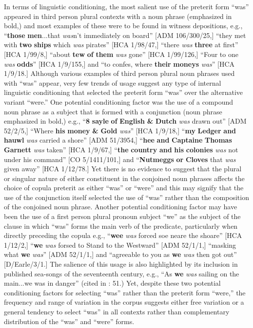 In terms of linguistic conditioning, the most salient use of the preterit form “was” appeared in third person plural contexts with a noun phrase (emphasized in bold,) and most examples of these were to be found in witness depositions, e.g., “\textbf{those} \textbf{men}...that \textit{was}n't immediately on board” [ADM 106/300/25,] “they met with \textbf{two} \textbf{ships} which \textit{was} pirates” [HCA 1/98/47,] “there \textit{was} \textbf{three} at first” [HCA 1/99/8,] “about \textbf{tew} \textbf{of} \textbf{them} \textit{was} gone” [HCA 1/99/126,] “Four to one \textit{was} \textbf{odds}” [HCA 1/9/155,] and “to confes, where \textbf{their} \textbf{moneys} \textit{was}” [HCA 1/9/18.] Although various examples of third person plural noun phrases used with “was” appear, very few trends of usage suggest any type of internal linguistic conditioning that selected the preterit form “was” over the alternative variant “were.”  One potential conditioning factor was the use of a compound noun phrase as a subject that is formed with a conjunction (noun phrase emphasized in bold,) e.g., “\textbf{8} \textbf{sayle} \textbf{of} \textbf{English} \textbf{\&}  \textbf{Dutch} \textit{was} drawn out” [ADM 52/2/5,] “Where \textbf{his} \textbf{money} \textbf{\&}  \textbf{Gold} \textit{was}” [HCA 1/9/18,] “\textbf{my} \textbf{Ledger} \textbf{and} \textbf{hauwl} \textit{was} carried a shore” [ADM 51/3954,] “\textbf{hee} \textbf{and} \textbf{Captaine} \textbf{Thomas} \textbf{Garnett} \textit{was} taken” [HCA 1/9/67,] “\textbf{the} \textbf{country} \textbf{and} \textbf{his} \textbf{colonies} \textit{was} not under his command” [CO 5/1411/101,] and “\textbf{Nutmeggs} \textbf{or} \textbf{Cloves} that \textit{was} given away” [HCA 1/12/78.] Yet there is no evidence to suggest that the plural or singular nature of either constituent in the conjoined noun phrases affects the choice of copula preterit as either “was” or “were” and this may signify that the use of the conjunction itself selected the use of “was” rather than the composition of the conjoined noun phrase. Another potential conditioning factor may have been the use of a first person plural pronoun subject “we” as the subject of the clause in which “was” forms the main verb of the predicate, particularly when directly preceding the copula e.g., “\textbf{wee} \textit{was} forced soe neare the shoare” [HCA 1/12/2,] “\textbf{we} \textit{was} forsed to Stand to the Westward” [ADM 52/1/1,] “masking what \textbf{we} \textit{was}” [ADM 52/1/1,] and “agreeable to you as \textbf{we} \textit{was} then got out” [D/Earle/3/1.] The salience of this usage is also highlighted by its inclusion in published sea-songs of the seventeenth century, e.g., “As \textbf{we} \textit{was} sailing on the main...we was in danger” (cited in \citealt{Palmer1986}: 51.) Yet, despite these two potential conditioning factors for selecting “was” rather than the preterit form “were,” the frequency and range of variation in the corpus suggests either free variation or a general tendency to select “was” in all contexts rather than complementary distribution of the “was” and “were” forms. 


